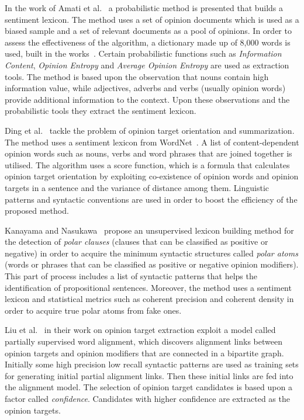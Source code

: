 In the work of Amati et al.~\cite{AABG18}
a probabilistic method is presented that builds a sentiment lexicon.
The method uses a set of opinion documents which is used as a biased sample
and a set of relevant documents as a pool of opinions.
In order to assess the effectiveness of the algorithm,
a dictionary made up of 8,000 words is used, built in the works~\cite{RW03,SV07}.
Certain probabilistic functions such as \emph{Information Content},
\emph{Opinion Entropy} and \emph{Average Opinion Entropy} are used
as extraction tools.
The method is based upon the observation that nouns contain high information value,
while adjectives, adverbs and verbs (usually opinion words) provide additional information to the context.
Upon these observations and the probabilistic tools
they extract the sentiment lexicon.

Ding et al.~\cite{DLY08} tackle the problem of opinion target orientation
and summarization.
The method uses a sentiment lexicon from WordNet~\cite{HL04}.
A list of content-dependent opinion words such as nouns, verbs and word phrases
that are joined together is utilised.
The algorithm uses a score function,
which is a formula that calculates opinion target orientation
by exploiting co-existence of opinion words and opinion targets in a sentence
and the variance of distance among them.
Linguistic patterns and syntactic conventions are used
in order to boost the efficiency of the proposed method.

Kanayama and Nasukawa~\cite{KN06} propose an unsupervised lexicon building method
for the detection of \emph{polar clauses}
(clauses that can be classified as positive or negative)
in order to acquire the minimum syntactic structures called \emph{polar atoms}
(words or phrases that can be classified as positive or negative opinion modifiers).
This part of process includes a list of syntactic patterns
that helps the identification of propositional sentences.
Moreover, the method uses a sentiment lexicon and statistical metrics
such as coherent precision and coherent density
in order to acquire true polar atoms from fake ones.

Liu et al.~\cite{LXLZ13} in their work on opinion target extraction
exploit a model called partially supervised word alignment,
which discovers alignment links between opinion targets and opinion modifiers
that are connected in a bipartite graph.
Initially some high precision low recall syntactic patterns are used as training sets
for generating initial partial alignment links.
Then these initial links are fed into the alignment model.
The selection of opinion target candidates is based upon a factor called \emph{confidence}.
Candidates with higher confidence are extracted as the opinion targets.

